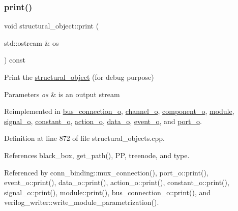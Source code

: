 \subsubsection{\texorpdfstring{print()}{print()}}
{\footnotesize\ttfamily void structural\+\_\+object\+::print (\begin{DoxyParamCaption}\item[{std\+::ostream \&}]{os }\end{DoxyParamCaption}) const\hspace{0.3cm}{\ttfamily [virtual]}}



Print the \hyperlink{classstructural__object}{structural\+\_\+object} (for debug purpose) 


\begin{DoxyParams}{Parameters}
{\em os} & is an output stream \\
\hline
\end{DoxyParams}


Reimplemented in \hyperlink{classbus__connection__o_ae96b465789da7122ed409f31bc43421a}{bus\+\_\+connection\+\_\+o}, \hyperlink{classchannel__o_ad3730f48e78b2404ab9acacf200cef73}{channel\+\_\+o}, \hyperlink{classcomponent__o_af842a5ea3400ce76c5fa2b9b33bcbf12}{component\+\_\+o}, \hyperlink{classmodule_a91f3995762c61b4bc46bd0520d72dc0a}{module}, \hyperlink{classsignal__o_a97cec23d951b1b816b4a76a3a07a1490}{signal\+\_\+o}, \hyperlink{classconstant__o_a9f4a121a1fcf146a4646f383fceb5d0a}{constant\+\_\+o}, \hyperlink{classaction__o_ab40aedb1cdbac2ac73d613b1036e4b43}{action\+\_\+o}, \hyperlink{classdata__o_a80e5ba60fe957aff679319a442c171b3}{data\+\_\+o}, \hyperlink{classevent__o_a013667eb14fd646a89ea8c5ce1c5cd13}{event\+\_\+o}, and \hyperlink{structport__o_a6a9748c4dc715b164cd1cb8f9d34ef80}{port\+\_\+o}.



Definition at line 872 of file structural\+\_\+objects.\+cpp.



References black\+\_\+box, get\+\_\+path(), PP, treenode, and type.



Referenced by conn\+\_\+binding\+::mux\+\_\+connection(), port\+\_\+o\+::print(), event\+\_\+o\+::print(), data\+\_\+o\+::print(), action\+\_\+o\+::print(), constant\+\_\+o\+::print(), signal\+\_\+o\+::print(), module\+::print(), bus\+\_\+connection\+\_\+o\+::print(), and verilog\+\_\+writer\+::write\+\_\+module\+\_\+parametrization().

